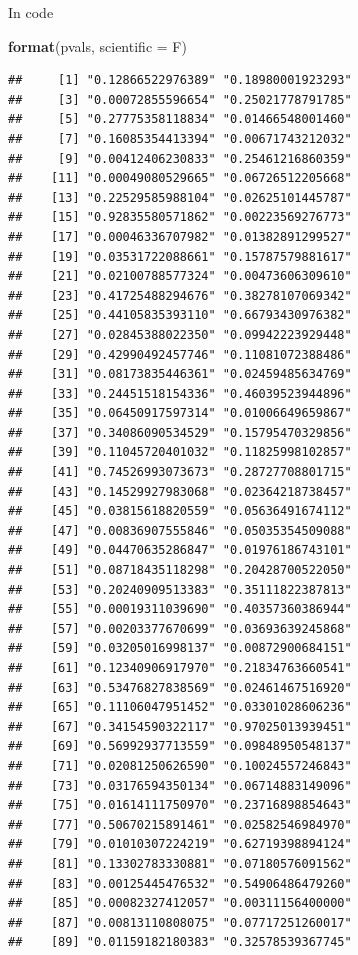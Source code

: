 \documentclass[ignorenonframetext,]{beamer}
\newenvironment{Shaded}{\begin{snugshade}}{\end{snugshade}}
\newcommand{\DataTypeTok}[1]{\textcolor[rgb]{0.13,0.29,0.53}{#1}}
\newcommand{\KeywordTok}[1]{\textcolor[rgb]{0.13,0.29,0.53}{\textbf{#1}}}
\newcommand{\NormalTok}[1]{#1}
\begin{document}
\begin{frame}[fragile]{In code}
\begin{Shaded}
\begin{Highlighting}[]
\KeywordTok{format}\NormalTok{(pvals, }\DataTypeTok{scientific =}\NormalTok{ F)}
\end{Highlighting}
\end{Shaded}

\begin{verbatim}
##     [1] "0.12866522976389" "0.18980001923293"
##     [3] "0.00072855596654" "0.25021778791785"
##     [5] "0.27775358118834" "0.01466548001460"
##     [7] "0.16085354413394" "0.00671743212032"
##     [9] "0.00412406230833" "0.25461216860359"
##    [11] "0.00049080529665" "0.06726512205668"
##    [13] "0.22529585988104" "0.02625101445787"
##    [15] "0.92835580571862" "0.00223569276773"
##    [17] "0.00046336707982" "0.01382891299527"
##    [19] "0.03531722088661" "0.15787579881617"
##    [21] "0.02100788577324" "0.00473606309610"
##    [23] "0.41725488294676" "0.38278107069342"
##    [25] "0.44105835393110" "0.66793430976382"
##    [27] "0.02845388022350" "0.09942223929448"
##    [29] "0.42990492457746" "0.11081072388486"
##    [31] "0.08173835446361" "0.02459485634769"
##    [33] "0.24451518154336" "0.46039523944896"
##    [35] "0.06450917597314" "0.01006649659867"
##    [37] "0.34086090534529" "0.15795470329856"
##    [39] "0.11045720401032" "0.11825998102857"
##    [41] "0.74526993073673" "0.28727708801715"
##    [43] "0.14529927983068" "0.02364218738457"
##    [45] "0.03815618820559" "0.05636491674112"
##    [47] "0.00836907555846" "0.05035354509088"
##    [49] "0.04470635286847" "0.01976186743101"
##    [51] "0.08718435118298" "0.20428700522050"
##    [53] "0.20240909513383" "0.35111822387813"
##    [55] "0.00019311039690" "0.40357360386944"
##    [57] "0.00203377670699" "0.03693639245868"
##    [59] "0.03205016998137" "0.00872900684151"
##    [61] "0.12340906917970" "0.21834763660541"
##    [63] "0.53476827838569" "0.02461467516920"
##    [65] "0.11106047951452" "0.03301028606236"
##    [67] "0.34154590322117" "0.97025013939451"
##    [69] "0.56992937713559" "0.09848950548137"
##    [71] "0.02081250626590" "0.10024557246843"
##    [73] "0.03176594350134" "0.06714883149096"
##    [75] "0.01614111750970" "0.23716898854643"
##    [77] "0.50670215891461" "0.02582546984970"
##    [79] "0.01010307224219" "0.62719398894124"
##    [81] "0.13302783330881" "0.07180576091562"
##    [83] "0.00125445476532" "0.54906486479260"
##    [85] "0.00082327412057" "0.00311156400000"
##    [87] "0.00813110808075" "0.07717251260017"
##    [89] "0.01159182180383" "0.32578539367745"

\end{verbatim}
\end{frame}
\end{document}
